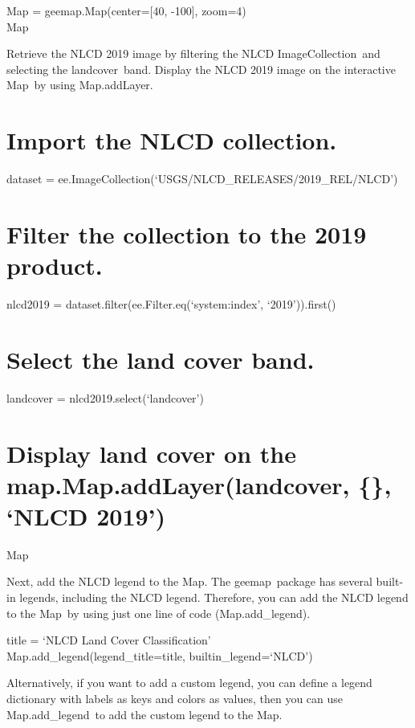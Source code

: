 \documentclass[
  letterpaper,
  DIV=11,
  numbers=noendperiod]{scrreprt}
\begin{document}
Map = geemap.Map(center={[}40, -100{]}, zoom=4)\\
Map

Retrieve the NLCD 2019 image by filtering the NLCD ImageCollection~and
selecting the landcover~band. Display the NLCD 2019 image on the
interactive Map~by using Map.addLayer.

\hypertarget{import-the-nlcd-collection.}{%
\chapter{Import the NLCD
collection.}\label{import-the-nlcd-collection.}}

dataset = ee.ImageCollection(`USGS/NLCD\_RELEASES/2019\_REL/NLCD')

\hypertarget{filter-the-collection-to-the-2019-product.}{%
\chapter{Filter the collection to the 2019
product.}\label{filter-the-collection-to-the-2019-product.}}

nlcd2019 = dataset.filter(ee.Filter.eq(`system:index', `2019')).first()

\hypertarget{select-the-land-cover-band.}{%
\chapter{Select the land cover
band.}\label{select-the-land-cover-band.}}

landcover = nlcd2019.select(`landcover')

\hypertarget{display-land-cover-on-the-map.map.addlayerlandcover-nlcd-2019}{%
\chapter{Display land cover on the map.Map.addLayer(landcover, \{\},
`NLCD
2019')}\label{display-land-cover-on-the-map.map.addlayerlandcover-nlcd-2019}}

Map

Next, add the NLCD legend to the Map. The geemap~package has several
built-in legends, including the NLCD legend. Therefore, you can add the
NLCD legend to the Map~by using just one line of code (Map.add\_legend).

title = `NLCD Land Cover Classification'\\
Map.add\_legend(legend\_title=title, builtin\_legend=`NLCD')

Alternatively, if you want to add a custom legend, you can define a
legend dictionary with labels as keys and colors as values, then you can
use Map.add\_legend~to add the custom legend to the Map. ~
\end{document}
